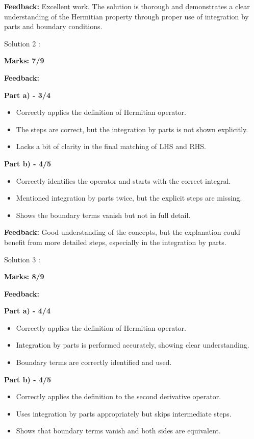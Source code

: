 \documentclass[a4paper,11pt]{article}
\begin{document}
\textbf{Feedback:}
Excellent work. The solution is thorough and demonstrates a clear understanding of the Hermitian property through proper use of integration by parts and boundary conditions.


Solution 2 :

\textbf{Marks: 7/9}

\textbf{Feedback:}

\textbf{Part a) - 3/4}

\begin{itemize}
    \item Correctly applies the definition of Hermitian operator.
    \item The steps are correct, but the integration by parts is not shown explicitly.
    \item Lacks a bit of clarity in the final matching of LHS and RHS.
\end{itemize}

\textbf{Part b) - 4/5}

\begin{itemize}
    \item Correctly identifies the operator and starts with the correct integral.
    \item Mentioned integration by parts twice, but the explicit steps are missing.
    \item Shows the boundary terms vanish but not in full detail.
\end{itemize}

\textbf{Feedback:}
Good understanding of the concepts, but the explanation could benefit from more detailed steps, especially in the integration by parts.


Solution 3 :

\textbf{Marks: 8/9}

\textbf{Feedback:}

\textbf{Part a) - 4/4}

\begin{itemize}
    \item Correctly applies the definition of Hermitian operator.
    \item Integration by parts is performed accurately, showing clear understanding.
    \item Boundary terms are correctly identified and used.
\end{itemize}

\textbf{Part b) - 4/5}

\begin{itemize}
    \item Correctly applies the definition to the second derivative operator.
    \item Uses integration by parts appropriately but skips intermediate steps.
    \item Shows that boundary terms vanish and both sides are equivalent.
\end{itemize}
\end{document}
